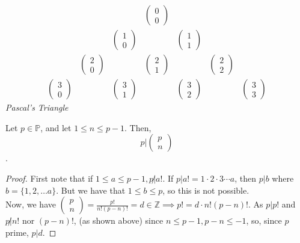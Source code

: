 \documentclass[12pt,oneside]{article}
\begin{document}
\[
\begin{array}{rrrrrrr}
  & & & \begin{pmatrix}
    0\\0
  \end{pmatrix} & & & \\
  & & \begin{pmatrix}
    1\\
    0
  \end{pmatrix} & & \begin{pmatrix}
    1\\1
  \end{pmatrix} & \\
  & \begin{pmatrix}
    2\\0
  \end{pmatrix} && \begin{pmatrix}
    2 \\1
  \end{pmatrix} && \begin{pmatrix}
    2 \\ 2
  \end{pmatrix} & \\
  \begin{pmatrix}
    3 \\0
  \end{pmatrix} && \begin{pmatrix}
    3 \\1
  \end{pmatrix} & &
  \begin{pmatrix}
    3 \\2
  \end{pmatrix} & &
  \begin{pmatrix}
    3 \\3
  \end{pmatrix}
\end{array}
\]
\textit{Pascal's Triangle}
\begin{lemma}\label{lemma:binomialprime}
  Let $p \in \mathbb{P}$, and let $1 \leq n \leq p - 1$. Then, $$p | \begin{pmatrix}
    p\\n
  \end{pmatrix}$$.
\end{lemma}


\begin{proof}
  First note that if $1 \leq a \leq p -1, p \not|a!$. If $p | a! = 1\cdot 2 \cdot 3 \cdots a$, then $p | b$ where $b = \{1, 2, \dots a\}$. But we have that $1 \leq b \leq p$, so this is not possible.\\
  Now, we have $\begin{pmatrix}
    p\\
    n
  \end{pmatrix} = \frac{p!}{n!(p-n)!} = d \in \mathbb{Z} \implies p! = d \cdot n!(p-n)!$. As $p | p!$ and $p\not|n!$ nor $(p-n)!$, (as shown above) since $n \leq p -1, p-n \leq - 1$, so, since $p$ prime, $p | d$.
\end{proof}
\end{document}
